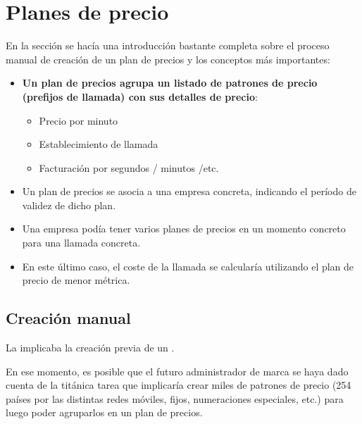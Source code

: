 \documentclass[letterpaper,10pt,spanish]{sphinxmanual}
\begin{document}
\section{Planes de precio}
\label{billing_and_invoices/pricing_plans:pricing-plans}\label{billing_and_invoices/pricing_plans::doc}
En la sección {\hyperref[external_outgoing_calls/noplan_nocall:noplan\string-nocall]{}} se hacía una introducción bastante completa sobre el proceso manual de creación de un plan de precios y los conceptos más importantes:
\begin{itemize}
\item {} 
\textbf{Un plan de precios agrupa un listado de patrones de precio (prefijos de llamada) con sus detalles de precio}:
\begin{itemize}
\item {} 
Precio por minuto

\item {} 
Establecimiento de llamada

\item {} 
Facturación por segundos / minutos /etc.

\end{itemize}

\item {} 
Un plan de precios se asocia a una empresa concreta, indicando el período de validez de dicho plan.

\item {} 
Una empresa podía tener varios planes de precios en un momento concreto para una llamada concreta.

\item {} 
En este último caso, el coste de la llamada se calcularía utilizando el plan de precio de menor métrica.

\end{itemize}


\subsection{Creación manual}
\label{billing_and_invoices/pricing_plans:manual-creation}
La {\hyperref[external_outgoing_calls/noplan_nocall:price\string-plan]{}} implicaba la creación previa de un {\hyperref[external_outgoing_calls/noplan_nocall:price\string-pattern]{}}.

En ese momento, es posible que el futuro administrador de marca se haya dado cuenta de la titánica tarea que implicaría crear miles de patrones de precio (254 países por las distintas redes móviles, fijos, numeraciones especiales, etc.) para luego poder agruparlos en un plan de precios.
\end{document}
